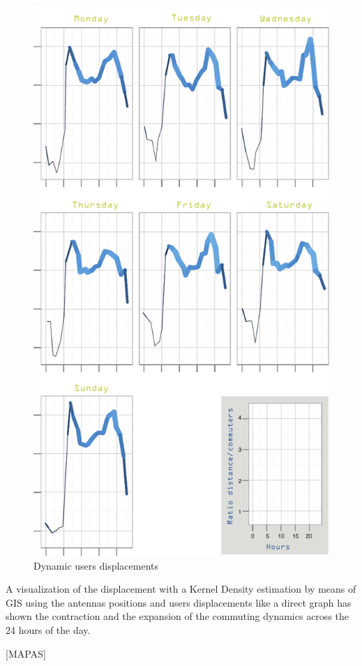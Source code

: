 \begin{figure}[h]
\begin{center}
\includegraphics[scale = 1.0] {results/images/commuting_results.pdf}
\caption{Dynamic users displacements}
\label{fig:dynamic_displacements}
\end{center}
\end{figure}

A visualization of the displacement with a Kernel Density estimation by means of GIS using the antennas positions and users displacements like a direct graph has shown the contraction and the expansion of the commuting dynamics across the 24 hours of the day.

[MAPAS]
